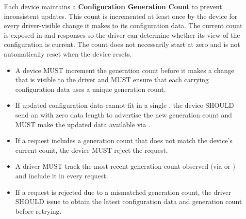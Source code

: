Each device maintains a \textbf{Configuration Generation Count} to prevent
inconsistent updates. This count is incremented at least once by the device for
every driver-visible change it makes to its configuration data. The current
count is exposed in  and  responses so
the driver can determine whether its view of the configuration is current. The
count does not necessarily start at zero and is not automatically reset when
the device resets.

\begin{itemize}
  \item A device MUST increment the generation count before it makes a change that is visible to the
        driver and MUST ensure that each  carrying configuration data uses a
        unique generation count.
  \item If updated configuration data cannot fit in a single , the device SHOULD
        send an  with zero data length to advertise the new generation count and
        MUST make the updated data available via .
  \item If a  request includes a generation count that does not match the device's
        current count, the device MUST reject the request.
\end{itemize}

\begin{itemize}
  \item A driver MUST track the most recent generation count observed (via  or
        ) and include it in every  request.
  \item If a  request is rejected due to a mismatched generation count, the driver
        SHOULD issue  to obtain the latest configuration data and generation count
        before retrying.
\end{itemize}

